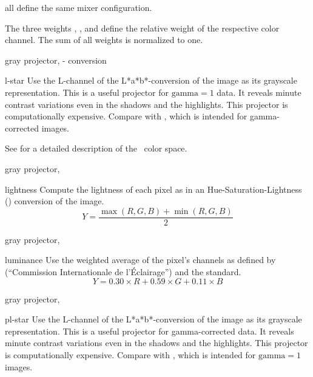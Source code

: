 \begin{codelist}
\begin{codelist}
    all define the same mixer configuration.

    The three weights , , and
     define the relative weight of the respective color channel.  The
    sum of all weights is normalized to one.

           {gray projector, }%
           {- conversion}%
  \item[l-star]\itemend
    Use the L-channel of the L*a*b*-conversion of the image as its grayscale representation.
    This is a useful projector for $\mbox{gamma} = 1$ data.  It reveals minute contrast
    variations even in the shadows and the highlights.  This projector is computationally
    expensive.  Compare with , which is intended for gamma-corrected images.

    See  for a detailed description of the
    ~color space.

           {gray projector, }%
  \item[lightness]\itemend
    Compute the lightness of each  pixel as in an
    Hue\hyp{}Saturation\hyp{}Lightness () conversion of the image.
    \[
    Y = \frac{\max(R, G, B) + \min(R, G, B)}{2}
    \]

           {gray projector, }%
  \item[luminance]\itemend
    Use the weighted average of the  pixel's channels as defined by 
    (``Commission Internationale de l'\'Eclairage'') and the  standard.
    \[
    Y = 0.30 \times R + 0.59 \times G + 0.11 \times B
    \]

           {gray projector, }%
  \item[pl-star]\itemend
    Use the L-channel of the L*a*b*-conversion of the image as its grayscale representation.
    This is a useful projector for gamma-corrected data.  It reveals minute contrast variations
    even in the shadows and the highlights.  This projector is computationally expensive.
    Compare with , which is intended for $\mbox{gamma} = 1$ images.


\end{codelist}
\end{codelist}
